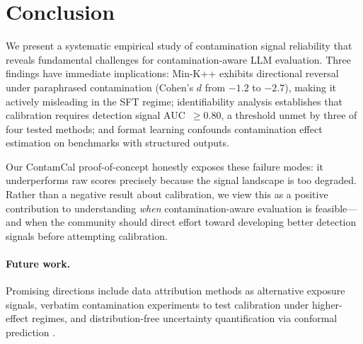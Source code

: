 \documentclass[11pt]{article}
\begin{document}
\section{Conclusion}

We present a systematic empirical study of contamination signal reliability that reveals fundamental challenges for contamination-aware LLM evaluation.
Three findings have immediate implications:
Min-K++ exhibits directional reversal under paraphrased contamination (Cohen's $d$ from $-1.2$ to $-2.7$), making it actively misleading in the SFT regime;
identifiability analysis establishes that calibration requires detection signal AUC~$\geq 0.80$, a threshold unmet by three of four tested methods;
and format learning confounds contamination effect estimation on benchmarks with structured outputs.

Our ContamCal proof-of-concept honestly exposes these failure modes: it underperforms raw scores precisely because the signal landscape is too degraded.
Rather than a negative result about calibration, we view this as a positive contribution to understanding \emph{when} contamination-aware evaluation is feasible---and when the community should direct effort toward developing better detection signals before attempting calibration.

\paragraph{Future work.}
Promising directions include data attribution methods \citep{pruthi2020estimating,park2023trak} as alternative exposure signals, verbatim contamination experiments to test calibration under higher-effect regimes, and distribution-free uncertainty quantification via conformal prediction \citep{angelopoulos2023conformal}.




\end{document}
